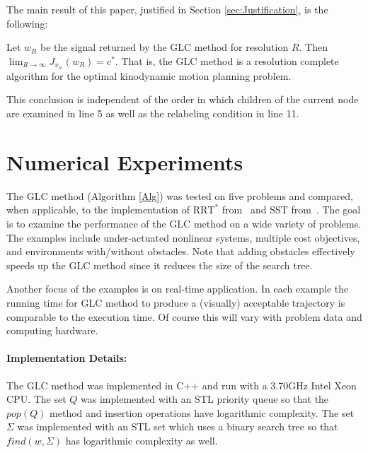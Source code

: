 \documentclass{llncs}
\newcommand{\GLC}{\ensuremath{\mathrm{GLC}}\xspace}
\newcommand{\RRTs}{\ensuremath{\mathrm{RRT}^*}\xspace}
\newcommand{\SST}{\ensuremath{\mathrm{SST}}\xspace}
\begin{document}
%
The main result of this paper, justified in Section \ref{sec:Justification}, is the following:
\begin{theorem}\label{thm:informal}
	Let $w_R$ be the signal returned by the \GLC method for resolution $R$. Then $\lim_{R\rightarrow \infty} J_{x_{ic}}(w_R)=c^*$. That is, the \GLC method is a resolution complete algorithm for the optimal kinodynamic motion planning problem.
\end{theorem}
% 
This conclusion is independent of the order in which children of the current node are examined in line 5 as well as the relabeling condition in line 11. 

%
%

\section{\label{sec:Numerical-Examples}Numerical Experiments}

The \GLC method (Algorithm \ref{Alg}) was tested on five problems and compared, when applicable, to the implementation of \RRTs from~\cite{rrt_implementation} and \SST from~\cite{BBekris2015}. 
%
The goal is to examine the performance of the \GLC method on a wide variety of problems. 
%
The examples include under-actuated nonlinear systems, multiple cost objectives, and environments with/without obstacles.
%
Note that adding obstacles effectively speeds up the \GLC method since it reduces the size of the search tree.
%

%
Another focus of the examples is on real-time application.
%
In each example the running time for \GLC method to produce a (visually) acceptable trajectory is comparable to the execution time.
%
Of course this will vary with problem data and computing hardware.    

\paragraph{Implementation Details:}

The \GLC method was implemented in C++ and run with a 3.70GHz Intel Xeon CPU. 
%
The set $Q$ was implemented with an STL priority queue so that the $pop(Q)$ method and insertion operations have logarithmic complexity. 
%
The set $\Sigma$ was implemented with an STL set which uses a binary search tree so that $find(w,\Sigma)$ has logarithmic complexity as well. 
%
\end{document}
